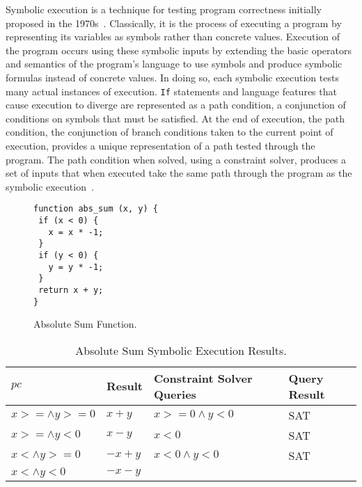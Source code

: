 \documentclass[]{final_report}
\begin{document}
Symbolic execution is a technique for testing program correctness initially proposed in the 1970s~\cite{king1976symbolic, boyer1975select}. Classically, it is the process of executing a program by representing its variables as symbols rather than concrete values. Execution of the program occurs using these symbolic inputs by extending the basic operators and semantics of the program's language to use symbols and produce symbolic formulas instead of concrete values. In doing so, each symbolic execution tests many actual instances of execution. \lstinline|If| statements and language features that cause execution to diverge are represented as a path condition, a conjunction of conditions on symbols that must be satisfied. At the end of execution, the path condition, the conjunction of branch conditions taken to the current point of execution, provides a unique representation of a path tested through the program. The path condition when solved, using a constraint solver, produces a set of inputs that when executed take the same path through the program as the symbolic execution~\cite{godefroid2008automated, godefroid2005dart}.

\begin{figure}[t]
\begin{lstlisting}
function abs_sum (x, y) {
 if (x < 0) {
   x = x * -1;
 }
 if (y < 0) {
   y = y * -1;
 }
 return x + y;
}
\end{lstlisting}
\caption{\label{fig:abs-sum} Absolute Sum Function.}
\end{figure} 

\begin{table}[t]
\centering
\begin{tabular}{|l|l|l|l|}
\hline
$pc$                & Result  & Constraint Solver Queries & Query Result \\ \hline
$x >= \land y >= 0$ & $x+y$   & $x >=0 \land y < 0 $      & SAT          \\ \hline
$x >= \land y < 0$  & $x - y$ & $x <0 $                   & SAT          \\ \hline
$x < \land y >= 0$  & $-x+y$  & $x<0 \land y < 0 $        & SAT          \\ \hline
$x < \land y < 0$   & $-x-y$  &                           &              \\ \hline
\end{tabular}
\caption{Absolute Sum Symbolic Execution Results.}
\label{abs-sum-se-table}
\end{table}
\end{document}
